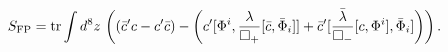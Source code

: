 \begin{equation}
S_{\rm FP}= {\rm tr}\int d^8z
\,\left( (\bar{c}'c-c'\bar{c})- \left( c' [\Phi^{i},{\lambda\over
\Box_{+}} [\bar{c},\bar{\Phi}_{i} ] ]+ \bar{c}' [{\bar\lambda\over
\Box_{-}} [c,\Phi^{i} ],\bar{\Phi}_{i} ] \right)\right).\label{acfp}
\end{equation}

